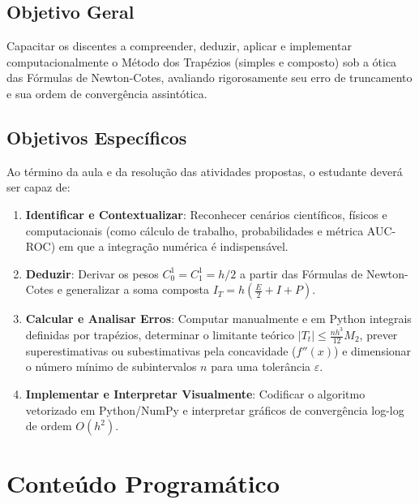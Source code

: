 \documentclass[11pt,a4paper]{article}
\begin{document}
\subsection{Objetivo Geral}
Capacitar os discentes a compreender, deduzir, aplicar e implementar computacionalmente o Método dos Trapézios (simples e composto) sob a ótica das Fórmulas de Newton-Cotes, avaliando rigorosamente seu erro de truncamento e sua ordem de convergência assintótica.

\subsection{Objetivos Específicos}
Ao término da aula e da resolução das atividades propostas, o estudante deverá ser capaz de:
\begin{enumerate}[leftmargin=1.6em]
    \item \textbf{Identificar e Contextualizar}: Reconhecer cenários científicos, físicos e computacionais (como cálculo de trabalho, probabilidades e métrica AUC-ROC) em que a integração numérica é indispensável.
    \item \textbf{Deduzir}: Derivar os pesos $C_0^1 = C_1^1 = h/2$ a partir das Fórmulas de Newton-Cotes e generalizar a soma composta $I_T = h\left(\frac{E}{2} + I + P\right)$.
    \item \textbf{Calcular e Analisar Erros}: Computar manualmente e em Python integrais definidas por trapézios, determinar o limitante teórico $|T_t| \le \frac{nh^3}{12}M_2$, prever superestimativas ou subestimativas pela concavidade ($f''(x)$) e dimensionar o número mínimo de subintervalos $n$ para uma tolerância $\varepsilon$.
    \item \textbf{Implementar e Interpretar Visualmente}: Codificar o algoritmo vetorizado em Python/NumPy e interpretar gráficos de convergência log-log de ordem $O(h^2)$.
\end{enumerate}

\section{Conteúdo Programático}
\end{document}
